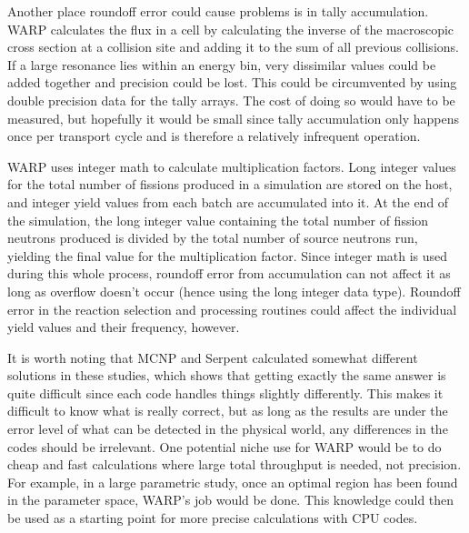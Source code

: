\documentclass[preprint,12pt]{elsarticle}
\begin{document}
Another place roundoff error could cause problems is in tally accumulation.  WARP calculates the flux in a cell by calculating the inverse of the macroscopic cross section at a collision site and adding it to the sum of all previous collisions.  If a large resonance lies within an energy bin, very dissimilar values could be added together and precision could be lost.  This could be circumvented by using double precision data for the tally arrays.  The cost of doing so would have to be measured, but hopefully it would be small since tally accumulation only happens once per transport cycle and is therefore a relatively infrequent operation.

WARP uses integer math to calculate multiplication factors.  Long integer values for the total number of fissions produced in a simulation are stored on the host, and integer yield values from each batch are accumulated into it.  At the end of the simulation, the long integer value containing the total number of fission neutrons produced is divided by the total number of source neutrons run, yielding the final value for the multiplication factor. Since integer math is used during this whole process, roundoff error from accumulation can not affect it as long as overflow doesn't occur (hence using the long integer data type).  Roundoff error in the reaction selection and processing routines could affect the individual yield values and their frequency, however.

It is worth noting that MCNP and Serpent calculated somewhat different solutions in these studies, which shows that getting exactly the same answer is quite difficult since each code handles things slightly differently.  This makes it difficult to know what is really correct, but as long as the results are under the error level of what can be detected in the physical world, any differences in the codes should be irrelevant.  One potential niche use for WARP would be to do cheap and fast calculations where large total throughput is needed, not precision.  For example, in a large parametric study, once an optimal region has been found in the parameter space, WARP's job would be done.  This knowledge could then be used as a starting point for more precise calculations with CPU codes.

\end{document}
